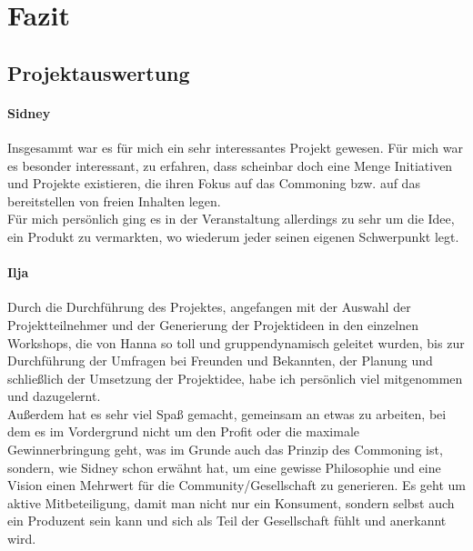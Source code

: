 
\chapter{Fazit} \label{Fazit}

\section{Projektauswertung} \label{Projektauswertung}

\subsubsection{Sidney}
Insgesammt war es für mich ein sehr interessantes Projekt gewesen. Für mich war es besonder interessant, zu erfahren, dass scheinbar doch eine Menge Initiativen und Projekte existieren, die ihren Fokus auf das Commoning bzw. auf das bereitstellen von freien Inhalten legen.\\
Für mich persönlich ging es in der Veranstaltung allerdings zu sehr um die Idee, ein Produkt zu vermarkten, wo wiederum jeder seinen eigenen Schwerpunkt legt.\\

\subsubsection{Ilja}
Durch die Durchführung des Projektes, angefangen mit der Auswahl der Projektteilnehmer und der Generierung der Projektideen in den einzelnen Workshops,
die von Hanna so toll und gruppendynamisch geleitet wurden, bis zur Durchführung der Umfragen bei Freunden und Bekannten, der Planung und schließlich der Umsetzung der Projektidee, habe ich persönlich viel mitgenommen und dazugelernt. \\
Außerdem hat es sehr viel Spaß gemacht, gemeinsam an etwas zu arbeiten, bei dem es im Vordergrund nicht um den Profit oder die maximale Gewinnerbringung geht, was im Grunde auch das Prinzip des Commoning ist, sondern, wie Sidney schon erwähnt hat, um eine gewisse Philosophie und eine Vision einen Mehrwert für die Community/Gesellschaft zu generieren. Es geht um aktive Mitbeteiligung, damit man nicht nur ein Konsument, sondern selbst auch ein Produzent sein kann und sich als Teil der Gesellschaft fühlt und anerkannt wird.

